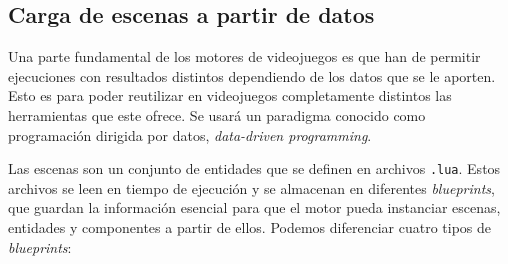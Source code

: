 \subsection{Carga de escenas a partir de datos}
Una parte fundamental de los motores de videojuegos es que han de permitir ejecuciones con resultados distintos dependiendo de los datos que se le aporten. Esto es para poder reutilizar en videojuegos completamente distintos las herramientas que este ofrece. Se usará un paradigma conocido como programación dirigida por datos, \textit{data-driven programming}. 

\medskip

Las escenas son un conjunto de entidades que se definen en archivos \texttt{.lua}. Estos archivos se leen en tiempo de ejecución y se almacenan en diferentes \textit{blueprints}, que guardan la información esencial para que el motor pueda instanciar escenas, entidades y componentes a partir de ellos. Podemos diferenciar cuatro tipos de \textit{blueprints}: 

